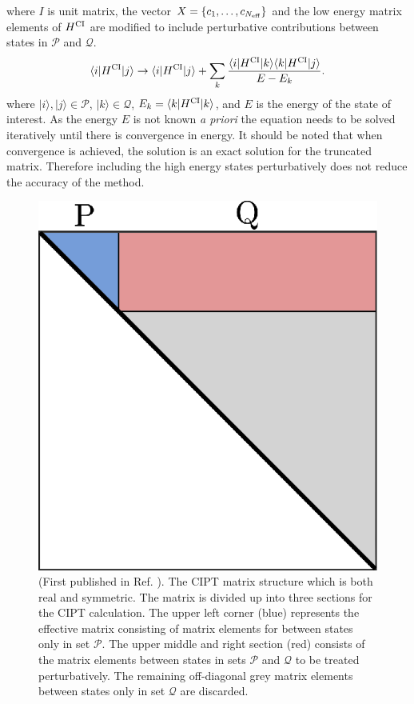 \documentclass[10pt,a4paper, twoside, openright]{report}
\begin{document}
where $I$ is unit matrix, the vector $X = \{c_1, \dots, c_{N_{\rm eff}}\}$ and the low energy matrix elements of $H^{\rm CI}$ are modified to include perturbative contributions between states in $\mathcal{P}$ and $\mathcal{Q}$.
\begin{equation}
\langle i|H^{\rm CI}|j\rangle \rightarrow \langle i|H^{\rm CI}|j\rangle + 
\sum_k \frac{\langle i|H^{\rm CI}|k\rangle\langle k|H^{\rm
    CI}|j\rangle}{E - E_k}. 
    \label{eq:HCI}
\end{equation}
where $|i\rangle, |j\rangle \in \mathcal{P}$, $|k\rangle \in \mathcal{Q}$,  $E_k = \langle k|H^{\rm CI}|k\rangle$, and $E$ is the energy of the state of interest.  As the energy $E$ is not known \textit{a priori} the equation needs to be solved iteratively until there is convergence in energy. It should be noted that when convergence is achieved, the solution is an exact solution for the truncated matrix. Therefore including the high energy states perturbatively does not reduce the accuracy of the method.
\begin{figure}
\centering
\includegraphics[scale=1]{./figures/CIPT_matrix.eps}
\caption[CIPT matrix structure.]{(First published in Ref. \cite{DBHF2017}). The CIPT matrix structure which is both real and symmetric. The matrix is divided up into three sections for the CIPT calculation. The upper left corner (blue) represents the effective matrix consisting of matrix elements for between states only in set $\mathcal{P}$. The upper middle and right section (red) consists of the matrix elements between states in sets $\mathcal{P}$ and $\mathcal{Q}$ to be treated perturbatively. The remaining off-diagonal grey matrix elements between states only in set $\mathcal{Q}$ are discarded. \label{fig:CIPT_matrix}}
\end{figure}
\iffalse
\end{document}
